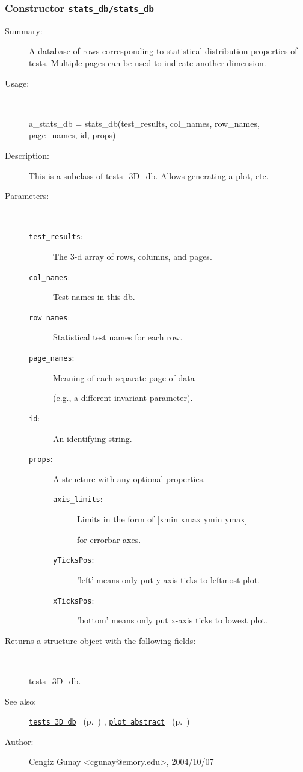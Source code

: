 \subsubsection[Constructor \texttt{stats\_db}]{Constructor \texttt{stats\_db/stats\_db}}%
%
\label{ref_stats_db__stats_db}%
\hypertarget{ref_stats_db__stats_db}{}%
\begin{description}
\item[Summary:]A database of rows corresponding to statistical distribution
		properties of tests. Multiple pages can be used to
		indicate another dimension.
%
\item[Usage:]~%
\begin{lyxcode}%
a\_stats\_db = stats\_db(test\_results, col\_names, row\_names, page\_names, 
			id, props)
%
\end{lyxcode}%
%
\item[Description:]%
This is a subclass of tests\_3D\_db. Allows generating a plot, etc.
\item[Parameters:]~
\begin{description}%
\item[\texttt{test\_results}:]
 The 3-d array of rows, columns, and pages.
\item[\texttt{col\_names}:]
 Test names in this db.
\item[\texttt{row\_names}:]
 Statistical test names for each row.
\item[\texttt{page\_names}:]
 Meaning of each separate page of data 

(e.g., a different invariant parameter).\item[\texttt{id}:]
 An identifying string.
\item[\texttt{props}:]
 A structure with any optional properties.
\begin{description}%
\item[\texttt{axis\_limits}:]
 Limits in the form of [xmin xmax ymin ymax]

for errorbar axes.\item[\texttt{yTicksPos}:]
 'left' means only put y-axis ticks to leftmost plot.
\item[\texttt{xTicksPos}:]
 'bottom' means only put x-axis ticks to lowest plot.
\end{description}%
\end{description}%
%
\item[Returns a structure object with the following fields:]~

	tests\_3D\_db.
%
%
\item[See also:]%
\hyperlink{ref_tests_3D_db}{\texttt{tests\_3D\_db}}%
\ (p.~\pageref{ref_tests_3D_db})%
%
, \hyperlink{ref_plot_abstract}{\texttt{plot\_abstract}}%
\ (p.~\pageref{ref_plot_abstract})%
%
%
\item[Author:]%
Cengiz Gunay <cgunay@emory.edu>, 2004/10/07%
\end{description}
\methodline%
